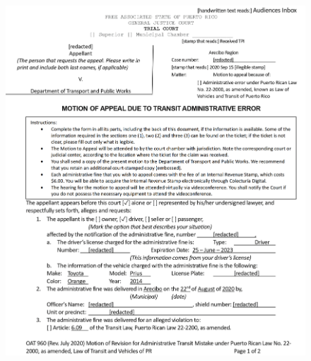 \documentclass{article}
\begin{document}
\begin{figure}[H]
	\centering
	\includegraphics[width=\textwidth]{../sample_translations/target_1_3.png}
\end{figure}
\end{document}
